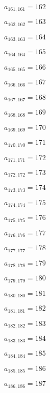 \documentclass[a4paper,12pt]{article}
\begin{document}
$a _{ 161, 161 } = 162$

$a _{ 162, 162 } = 163$

$a _{ 163, 163 } = 164$

$a _{ 164, 164 } = 165$

$a _{ 165, 165 } = 166$

$a _{ 166, 166 } = 167$

$a _{ 167, 167 } = 168$

$a _{ 168, 168 } = 169$

$a _{ 169, 169 } = 170$

$a _{ 170, 170 } = 171$

$a _{ 171, 171 } = 172$

$a _{ 172, 172 } = 173$

$a _{ 173, 173 } = 174$

$a _{ 174, 174 } = 175$

$a _{ 175, 175 } = 176$

$a _{ 176, 176 } = 177$

$a _{ 177, 177 } = 178$

$a _{ 178, 178 } = 179$

$a _{ 179, 179 } = 180$

$a _{ 180, 180 } = 181$

$a _{ 181, 181 } = 182$

$a _{ 182, 182 } = 183$

$a _{ 183, 183 } = 184$

$a _{ 184, 184 } = 185$

$a _{ 185, 185 } = 186$

$a _{ 186, 186 } = 187$
\end{document}
